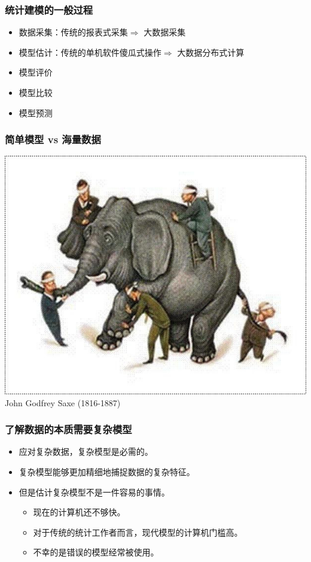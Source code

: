 \documentclass[11pt]{beamer}
\begin{document}
\begin{frame}
  \frametitle{统计建模的一般过程}

  \begin{itemize}
  \item 数据采集：传统的报表式采集$\Rightarrow$ 大数据采集
  \item 模型估计：传统的单机软件傻瓜式操作$\Rightarrow$ 大数据分布式计算
  \item 模型评价
  \item 模型比较
  \item 模型预测
  \end{itemize}
\end{frame}


\begin{frame}
  \frametitle{简单模型 vs 海量数据}

    \centering \includegraphics[height=0.75\textheight]{elephant}\\
    \tiny{John Godfrey Saxe (1816-1887)}
\end{frame}


\begin{frame}
  \frametitle{了解数据的本质需要复杂模型}

  \begin{itemize}
  \item 应对复杂数据，复杂模型是必需的。
  \item 复杂模型能够更加精细地捕捉数据的复杂特征。
  \item 但是估计复杂模型不是一件容易的事情。
    \begin{itemize}
    \item 现在的计算机还不够快。
    \item 对于传统的统计工作者而言，现代模型的计算机门槛高。
    \item 不幸的是错误的模型经常被使用。
    \end{itemize}
  \end{itemize}
\end{frame}
\end{document}
